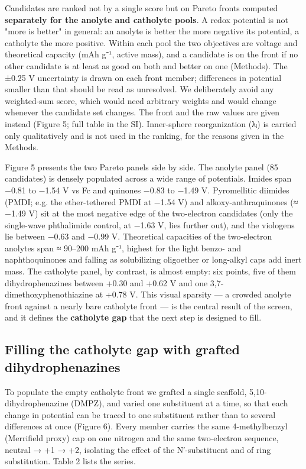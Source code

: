 \documentclass[journal=jcisd8,manuscript=article]{achemso}
\begin{document}
Candidates are ranked not by a single score but on Pareto fronts computed \textbf{separately for the anolyte and catholyte pools}. A redox potential is not "more is better" in general: an anolyte is better the more negative its potential, a catholyte the more positive. Within each pool the two objectives are voltage and theoretical capacity (mAh g⁻¹, active mass), and a candidate is on the front if no other candidate is at least as good on both and better on one (Methods). The ±0.25 V uncertainty is drawn on each front member; differences in potential smaller than that should be read as unresolved. We deliberately avoid any weighted-sum score, which would need arbitrary weights and would change whenever the candidate set changes. The front and the raw values are given instead (Figure 5; full table in the SI). Inner-sphere reorganization (λᵢ) is carried only qualitatively and is not used in the ranking, for the reasons given in the Methods.

Figure 5 presents the two Pareto panels side by side. The anolyte panel (85 candidates) is densely populated across a wide range of potentials. Imides span −0.81 to −1.54 V vs Fc and quinones −0.83 to −1.49 V. Pyromellitic diimides (PMDI; e.g. the ether-tethered PMDI at −1.54 V) and alkoxy-anthraquinones (≈ −1.49 V) sit at the most negative edge of the two-electron candidates (only the single-wave phthalimide control, at −1.63 V, lies further out), and the viologens lie between −0.63 and −0.99 V. Theoretical capacities of the two-electron anolytes span ≈ 90–200 mAh g⁻¹, highest for the light benzo- and naphthoquinones and falling as solubilizing oligoether or long-alkyl caps add inert mass. The catholyte panel, by contrast, is almost empty: six points, five of them dihydrophenazines between +0.30 and +0.62 V and one 3,7-dimethoxyphenothiazine at +0.78 V. This visual sparsity — a crowded anolyte front against a nearly bare catholyte front — is the central result of the screen, and it defines the \textbf{catholyte gap} that the next step is designed to fill.

\subsection{Filling the catholyte gap with grafted dihydrophenazines}

To populate the empty catholyte front we grafted a single scaffold, 5,10-dihydrophenazine (DMPZ), and varied one substituent at a time, so that each change in potential can be traced to one substituent rather than to several differences at once (Figure 6). Every member carries the same 4-methylbenzyl (Merrifield proxy) cap on one nitrogen and the same two-electron sequence, neutral → +1 → +2, isolating the effect of the N′-substituent and of ring substitution. Table 2 lists the series.
\end{document}
